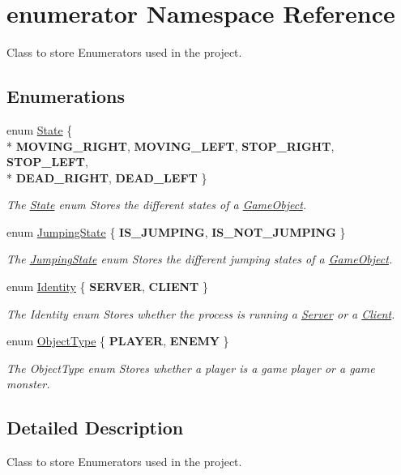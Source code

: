 \hypertarget{namespaceenumerator}{\section{enumerator Namespace Reference}
\label{namespaceenumerator}
}


Class to store Enumerators used in the project.  


\subsection*{Enumerations}
\begin{DoxyCompactItemize}
\item 
enum \hyperlink{namespaceenumerator_a5fc7b342c2c633e1037b07cea237a222}{State} \{ \\*
{\bfseries M\-O\-V\-I\-N\-G\-\_\-\-R\-I\-G\-H\-T}, 
{\bfseries M\-O\-V\-I\-N\-G\-\_\-\-L\-E\-F\-T}, 
{\bfseries S\-T\-O\-P\-\_\-\-R\-I\-G\-H\-T}, 
{\bfseries S\-T\-O\-P\-\_\-\-L\-E\-F\-T}, 
\\*
{\bfseries D\-E\-A\-D\-\_\-\-R\-I\-G\-H\-T}, 
{\bfseries D\-E\-A\-D\-\_\-\-L\-E\-F\-T}
 \}
\begin{DoxyCompactList}\small\item\em The \hyperlink{classState}{State} enum Stores the different states of a \hyperlink{classGameObject}{Game\-Object}. \end{DoxyCompactList}\item 
enum \hyperlink{namespaceenumerator_a2f1fb1ef7c57e4549f424d454c1e2179}{Jumping\-State} \{ {\bfseries I\-S\-\_\-\-J\-U\-M\-P\-I\-N\-G}, 
{\bfseries I\-S\-\_\-\-N\-O\-T\-\_\-\-J\-U\-M\-P\-I\-N\-G}
 \}
\begin{DoxyCompactList}\small\item\em The \hyperlink{classJumpingState}{Jumping\-State} enum Stores the different jumping states of a \hyperlink{classGameObject}{Game\-Object}. \end{DoxyCompactList}\item 
enum \hyperlink{namespaceenumerator_aa4c03441b2e09279e43235eb80525c6d}{Identity} \{ {\bfseries S\-E\-R\-V\-E\-R}, 
{\bfseries C\-L\-I\-E\-N\-T}
 \}
\begin{DoxyCompactList}\small\item\em The Identity enum Stores whether the process is running a \hyperlink{classServer}{Server} or a \hyperlink{classClient}{Client}. \end{DoxyCompactList}\item 
enum \hyperlink{namespaceenumerator_a74b6f7a3aada6983503ce0f88ee90b29}{Object\-Type} \{ {\bfseries P\-L\-A\-Y\-E\-R}, 
{\bfseries E\-N\-E\-M\-Y}
 \}
\begin{DoxyCompactList}\small\item\em The Object\-Type enum Stores whether a player is a game player or a game monster. \end{DoxyCompactList}\end{DoxyCompactItemize}


\subsection{Detailed Description}
Class to store Enumerators used in the project. 